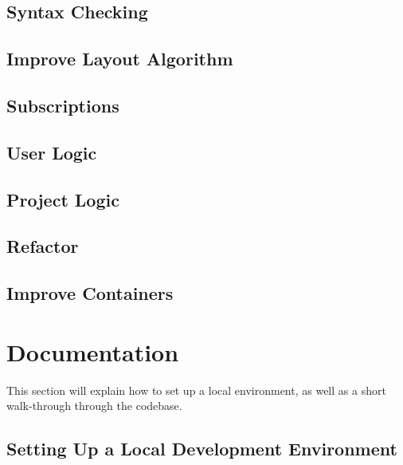 \section{Syntax Checking}
\section{Improve Layout Algorithm}
\section{Subscriptions}
\section{User Logic}
\section{Project Logic}
\section{Refactor}
\section{Improve Containers}

\chapter{Documentation}
\label{chap:Doc}
This section will explain how to set up a local environment, as well as a short walk-through through the codebase.

\section{Setting Up a Local Development Environment}
